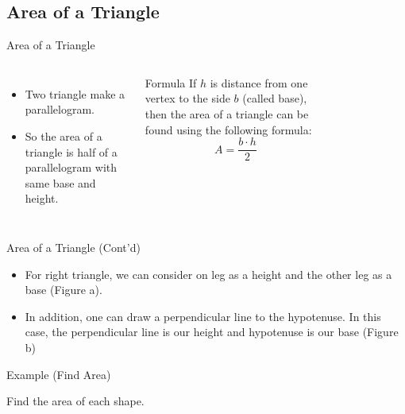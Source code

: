 \subsection{Area of a Triangle}
\begin{frame}{Area of a Triangle}
    \begin{columns}
        \begin{itemize}
            \item Two triangle make a parallelogram. 
            \item So the area of a triangle is half of a parallelogram with same base and height.
        \end{itemize}
        \begin{block}{Formula}
            If $h$ is distance from one vertex to the side $b$ (called base), then the area of a triangle can be found using the following formula:
            \[  A = \frac{b\cdot h}{2} \]
        \end{block}
    \begin{figure}[H]
        \centering
        
    \end{figure}        
    \end{columns}
\end{frame}
\begin{frame}{Area of a Triangle (Cont'd)}
    \begin{itemize}
        \item For right triangle, we can consider on leg as a height and the other leg as a base (Figure a).
        \item In addition, one can draw a perpendicular line to the hypotenuse. In this case, the perpendicular line is our height and hypotenuse is our base (Figure b)
    \end{itemize}
    \begin{figure}[H]
        \centering
        
    \end{figure} 
\end{frame}
\begin{frame}[t]{Example (Find Area)}
    \begin{example}
        Find the area of each shape.
        \begin{figure}[H]
            \centering
            
        \end{figure}
    \end{example}
\end{frame}
